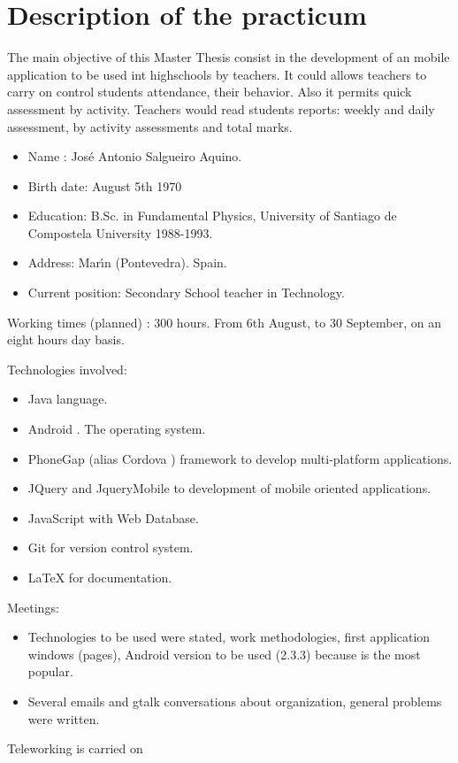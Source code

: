 \chapter{Description of the practicum}
The main objective of this Master Thesis consist in the development of an mobile application to be used int highschools by teachers.
It could allows teachers to carry on control students attendance, their behavior. Also it permits quick assessment by activity.
Teachers would read students reports: weekly and daily assessment, by activity assessments and total marks.
\begin{itemize}
  \item {Name :} Jos\'e Antonio Salgueiro Aquino.
  \item {Birth date: } August 5th 1970
\item {Education:} B.Sc. in Fundamental Physics, University of Santiago de Compostela University 1988-1993.
\item {Address:} Mar\'{\i}n (Pontevedra). Spain.
\item {Current position: } Secondary School teacher in Technology.
\end{itemize}

Working times (planned) :
  300 hours. 	From 6th August, to 30 September, on an eight hours day basis.

Technologies involved:
\begin{itemize}
  \item  Java \texttrademark  language.
  \item  Android \texttrademark . The operating  system.
  \item  PhoneGap \texttrademark (alias Cordova ) framework to develop multi-platform applications.
  \item  JQuery and JqueryMobile to development of mobile oriented applications.
  \item  JavaScript with Web Database.
  \item  Git for version control system.
  \item \LaTeX{} for documentation.
\end{itemize}

Meetings:
\begin{itemize}
  \item Technologies to be used were stated, work methodologies, first application windows (pages), Android version to be used (2.3.3) because is the most popular. 
  \item	Several emails and gtalk conversations about organization, general problems were written.
\end{itemize}
Teleworking is carried on 



